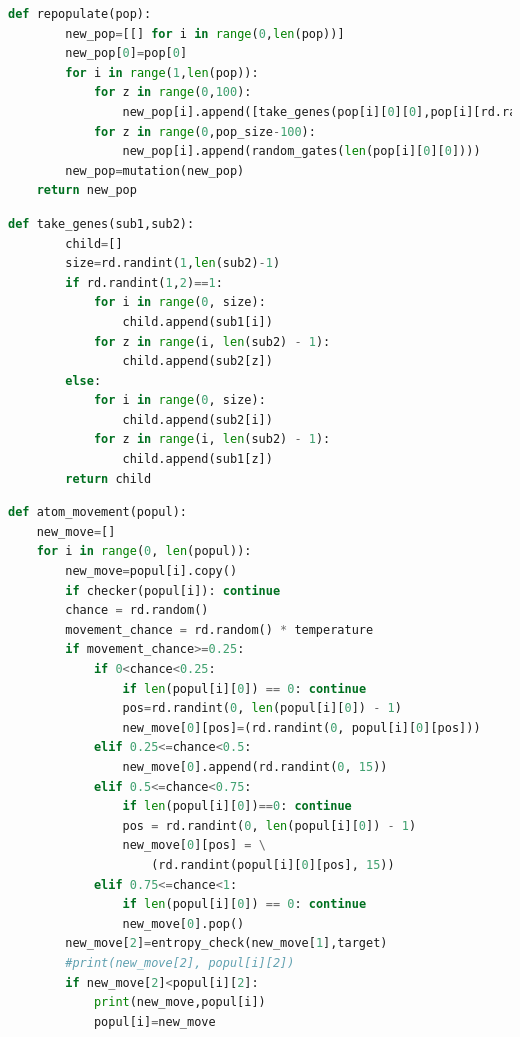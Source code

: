 \documentclass[14pt]{extarticle} %
\begin{document}



\begin{lstlisting}[language=Python, caption={Функция повторного создания популяции }, label=repopulate]
	def repopulate(pop):
	    new_pop=[[] for i in range(0,len(pop))]
	    new_pop[0]=pop[0]
	    for i in range(1,len(pop)):
	        for z in range(0,100):
	            new_pop[i].append([take_genes(pop[i][0][0],pop[i][rd.randint(1,len(pop[i])-1)][0])])
	        for z in range(0,pop_size-100):
	            new_pop[i].append(random_gates(len(pop[i][0][0])))
	    new_pop=mutation(new_pop)
	return new_pop
\end{lstlisting}


\begin{lstlisting}[language=Python, caption={Функция скрещивания }, label=take_genes]
	def take_genes(sub1,sub2):
	    child=[]
	    size=rd.randint(1,len(sub2)-1)
	    if rd.randint(1,2)==1:
	        for i in range(0, size):
	            child.append(sub1[i])
	        for z in range(i, len(sub2) - 1):
	            child.append(sub2[z])
    	else:
	        for i in range(0, size):
	            child.append(sub2[i])
	        for z in range(i, len(sub2) - 1):
	            child.append(sub1[z])
	    return child
\end{lstlisting}


\begin{lstlisting}[language=Python, caption={Функция перемещения атомов}, label=take_genes]
def atom_movement(popul):
    new_move=[]
    for i in range(0, len(popul)):
        new_move=popul[i].copy()
        if checker(popul[i]): continue
        chance = rd.random()
        movement_chance = rd.random() * temperature
        if movement_chance>=0.25:
            if 0<chance<0.25:
                if len(popul[i][0]) == 0: continue
                pos=rd.randint(0, len(popul[i][0]) - 1)
                new_move[0][pos]=(rd.randint(0, popul[i][0][pos]))
            elif 0.25<=chance<0.5:
                new_move[0].append(rd.randint(0, 15))
            elif 0.5<=chance<0.75:
                if len(popul[i][0])==0: continue
                pos = rd.randint(0, len(popul[i][0]) - 1)
                new_move[0][pos] = \
                    (rd.randint(popul[i][0][pos], 15))
            elif 0.75<=chance<1:
                if len(popul[i][0]) == 0: continue
                new_move[0].pop()
        new_move[2]=entropy_check(new_move[1],target)
        #print(new_move[2], popul[i][2])
        if new_move[2]<popul[i][2]:
            print(new_move,popul[i])
            popul[i]=new_move
\end{lstlisting}
\end{document}
